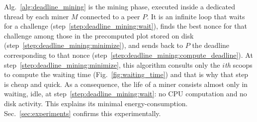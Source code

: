 \begin{algorithm}[t]
  \BlankLine
  \caption{The mining phase algorithm, performed by each miner $M$ in its own thread.}
  \label{alg:deadline_mining}
\end{algorithm}

Alg.~\ref{alg:deadline_mining} is the mining phase, executed inside a dedicated thread
by each miner $M$ connected to a peer $P$. It is an infinite loop that
waits for a challenge (step~\ref{step:deadline_mining:wait}), finds the best nonce
for that challenge among those in the precomputed plot stored on disk
(step~\ref{step:deadline_mining:minimize}), and sends back to $P$ the deadline
corresponding to that nonce (step~\ref{step:deadline_mining:compute_deadline}).
At step~\ref{step:deadline_mining:minimize}, this algorithm
consults only the $i$\textit{th} scoops to compute the waiting time
(Fig.~\ref{fig:waiting_time}) and that is why that step is cheap and quick.
As a consequence, the life of a miner consists almost only in waiting, idle,
at step~\ref{step:deadline_mining:wait}: no CPU computation and no disk activity.
This explains its minimal energy-consumption.
Sec.~\ref{sec:experiments} confirms this experimentally.

